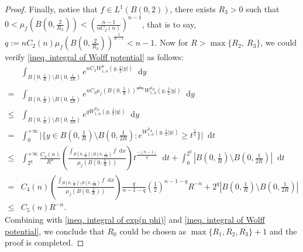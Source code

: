 \documentclass[10pt,a4paper]{amsart}
\numberwithin{equation}{section}
\newcommand{\dd}{\mathop{}\!\mathrm{d}}%
\newcommand{\dx}{\mathop{}\!\mathrm{d}x}
\newcommand{\dy}{\mathop{}\!\mathrm{d}y}
\begin{document}
\begin{proof}
    Finally, notice that $f\in L^1(B(0,2))$, there exists $R_3>0$ such that $0<\mu_f(B(0,\frac{2}{R_3}))<(\frac{n-1}{nC_2(n)})^{n-1}$, that is to say, $q:=nC_2(n)\mu_f(B(0,\frac{2}{R_3}))^{\frac{1}{n-1}}<n-1$. Now for $R>\max\{R_2,\ R_3\}$, we could verify \cref{ineq. integral of Wolff potential} as follows:
    \begin{align*}
        &\int_{B(0,\frac{1}{R})\setminus B(0,\frac{1}{2R})} e^{nC_2W_{1,n}^{\mu}(y,\frac{1}{2}|y|)}\dy\\
        =&\int_{B(0,\frac{1}{R})\setminus B(0,\frac{1}{2R})} e^{nC_2 \mu_f(B(0,\frac{2}{R}))^{\frac{1}{n-1}} W_{1,n}^{\mu_R}(y,\frac{1}{2}|y|)}\dy\\
        \leq&\int_{B(0,\frac{1}{R})\setminus B(0,\frac{1}{2R})}
        e^{qW_{1,n}^{\mu_R}(y,\frac{1}{2}|y|)}\dy
        \\
        =&\int_0^{+\infty}
        \Big|\Big\{
        y\in B(0,\frac{1}{R})\setminus B(0,\frac{1}{2R}):
        e^{W_{1,n}^{\mu_R}(y,\frac{1}{2}|y|)}
        \geq 
        t^{\frac{1}{q}}
        \Big\}\Big|\dd t\\
        \leq& \int_{2^{q}}^{+\infty}
        \frac{C_4(n)}{R^n}
         \left(\frac{\int_{B(0,\frac{1}{R})\setminus B(0,\frac{1}{2R})} f\dx}{\mu_f(B(0,\frac{2}{R}))}\right)
         t^{\frac{-(n-1)}{q}}
         \dd t
         +\int_0^{2^{q}}
         |B(0,\frac{1}{R})\setminus B(0,\frac{1}{2R})|\dd t\\
         =&C_4(n)
         \left(\frac{\int_{B(0,\frac{1}{R})\setminus B(0,\frac{1}{2R})} f\dx}{\mu_f(B(0,\frac{2}{R}))}\right)
         \frac{q}{n-1-q}
         \left(\frac{1}{2}\right)^{n-1-q}
         R^{-n}
         +2^{q}
         |B(0,\frac{1}{R})\setminus B(0,\frac{1}{2R})|\\
         \leq& C_5(n)R^{-n}.
    \end{align*}
    Combining with \cref{ineq. integral of exp(n phi)} and \cref{ineq. integral of Wolff potential}, we conclude that $R_0$ could be chosen as $\max\{R_1,R_2,R_3\}+1$ and the proof is completed.
\end{proof}
\end{document}
